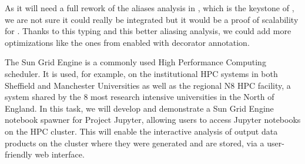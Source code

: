 \begin{workpackage}[id=hpc,wphases=0-48,
  title=High Performance Computing,
  PSRM=1, %
  LLRM=12, %
  SARM=18, %
  UKRM=1, %
  UBRM=1, %
  UJFRM=12]
\begin{tasklist}
\begin{task}[title=Explorative task: Add support for classes in \Pythran.]
  As it will need a full rework of the aliases analysis in \Pythran, which is
  the keystone of \Pythran, we are not sure it could really
  be integrated but it would be a proof of scalability for \Pythran.
  Thanks to this typing and this better aliasing analysis, we could add more
  optimizations like the ones from \Cython enabled with decorator annotation.
\end{task}

\begin{task}[Title=Sun Grid Engine Integration in Project Jupyter Hub]
The Sun Grid Engine is a commonly used High Performance Computing scheduler. It is used, for example, on the institutional HPC systems in both Sheffield and Manchester Universities as well as the regional N8 HPC facility, a system shared by the 8 most research intensive universities in the North of England. In this task, we will develop and demonstrate a Sun Grid Engine notebook spawner for Project Jupyter, allowing users to access Jupyter notebooks on the HPC cluster. This will enable the interactive analysis of output data products on the cluster where they were generated and are stored, via a user-friendly web interface.
\end{task}

\end{tasklist}


\end{workpackage}
